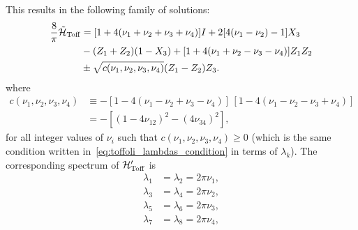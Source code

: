 This results in the following family of solutions:
\begin{equation}
\begin{aligned}
	\frac{8}{\pi}\tilde{\mathcal{H}}_{\operatorname{Toff}} &=
	[1 + 4(\nu_1+\nu_2+\nu_3+\nu_4)] I +
	2[4(\nu_1-\nu_2) - 1] X_3 \\
	&- (Z_1 + Z_2)(1 - X_3) +
	[1 + 4(\nu_1+\nu_2-\nu_3-\nu_4)] Z_1 Z_2 \\
	&\pm \sqrt{c(\nu_1,\nu_2,\nu_3,\nu_4)} (Z_1 - Z_2)Z_3.
\end{aligned}
\label{eq:toff_tilde_general_solution}
\end{equation}
where
\begin{equation}
\begin{split}
	c(\nu_1, \nu_2, \nu_3, \nu_4) &\equiv
		-[1 - 4(\nu_1 - \nu_2 + \nu_3 - \nu_4)]
		\, [1 - 4(\nu_1 - \nu_2 - \nu_3 + \nu_4)]\\
		&= -[(1-4\nu_{12})^2-(4\nu_{34})^2],
\end{split}
\end{equation}
for all integer values of $\nu_i$ such that $c(\nu_1, \nu_2, \nu_3, \nu_4) \ge 0$ (which is the same condition written in~\cref{eq:toffoli_lambdas_condition} in terms of $\lambda_k$).
The corresponding spectrum of $\mathcal{H}'_{\operatorname{Toff}}$ is
\begin{equation}
\begin{aligned}
	\lambda_1 &= \lambda_2 = 2\pi \nu_1, \\
	\lambda_3 &= \lambda_4 = 2\pi \nu_2, \\
	\lambda_5 &= \lambda_6 = 2\pi \nu_3, \\
	\lambda_7 &= \lambda_8 = 2\pi \nu_4, 
\end{aligned}
\end{equation}
